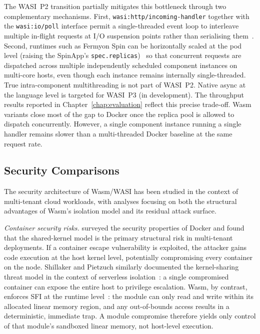 \begin{sloppypar}
The \acs{WASI}~P2 transition partially mitigates this bottleneck through two complementary mechanisms. First, \texttt{wasi:http/incoming-handler} together with the \texttt{wasi:io/poll} interface permit a single-threaded event loop to interleave multiple in-flight requests at I/O suspension points rather than serialising them~\cite{clark2023preview2, bytecodealliance2024componentmodel}. Second, runtimes such as Fermyon Spin can be horizontally scaled at the pod level (raising the SpinApp's \texttt{spec.replicas})~\cite{fermyon2024spin, spinkube2024} so that concurrent requests are dispatched across multiple independently scheduled component instances on multi-core hosts, even though each instance remains internally single-threaded. True intra-component multithreading is not part of \acs{WASI}~P2. Native async at the language level is targeted for \acs{WASI}~P3 (in development). The throughput results reported in Chapter~\ref{chap:evaluation} reflect this precise trade-off. \acs{Wasm} variants close most of the gap to Docker once the replica pool is allowed to dispatch concurrently. However, a single component instance running a single handler remains slower than a multi-threaded Docker baseline at the same request rate.
\end{sloppypar}

\subsection{Security Comparisons}
\label{sec:security_comparisons}

The security architecture of \acs{Wasm}/\acs{WASI} has been studied in the context of multi-tenant cloud workloads, with analyses focusing on both the structural advantages of \acs{Wasm}'s isolation model and its residual attack surface.

\textit{Container security risks.}\quad \textcite{combe2016docker} surveyed the security properties of Docker and found that the shared-kernel model is the primary structural risk in multi-tenant deployments. If a container escape vulnerability is exploited, the attacker gains code execution at the host kernel level, potentially compromising every container on the node. Shillaker and Pietzuch similarly documented the kernel-sharing threat model in the context of serverless isolation~\cite{shillaker2020faasm}: a single compromised container can expose the entire host to privilege escalation. \acs{Wasm}, by contrast, enforces \acs{SFI} at the runtime level~\cite{wahbe1993sfi, haas2017bringing}: the module can only read and write within its allocated linear memory region, and any out-of-bounds access results in a deterministic, immediate trap. A module compromise therefore yields only control of that module's sandboxed linear memory, not host-level execution.

